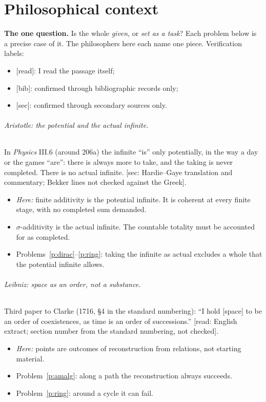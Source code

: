 \documentclass[11pt]{article}
\theoremstyle{definition}
\theoremstyle{remark}
\newcommand{\bp}[1]{\begin{mdframed}[backgroundcolor=black!4,linewidth=0.4pt]#1\end{mdframed}}
\begin{document}
\tableofcontents

\part*{Philosophical context}

\bp{\textbf{The one question.} Is the whole \emph{given}, or \emph{set as a task}?
Each problem below is a precise case of it. The philosophers here each name one
piece. Verification labels:
\begin{itemize}[nosep]
  \item \textsf{[read]}: I read the passage itself;
  \item \textsf{[bib]}: confirmed through bibliographic records only;
  \item \textsf{[sec]}: confirmed through secondary sources only.
\end{itemize}}

\paragraph{Aristotle: the potential and the actual infinite.}
In \emph{Physics} III.6 (around 206a) the infinite ``is'' only potentially, in the
way a day or the games ``are'': there is always more to take, and the taking is
never completed. There is no actual infinite. \textsf{[sec: Hardie--Gaye
translation and commentary; Bekker lines not checked against the Greek]}.
\begin{itemize}[nosep]
  \item \emph{Here:} finite additivity is the potential infinite. It is coherent
    at every finite stage, with no completed sum demanded.
  \item $\sigma$-additivity is the actual infinite. The countable totality must
    be accounted for as completed.
  \item Problems~\ref{p:dirac}--\ref{p:ring}: taking the infinite as actual
    excludes a whole that the potential infinite allows.
\end{itemize}

\paragraph{Leibniz: space as an order, not a substance.}
Third paper to Clarke (1716, \S4 in the standard numbering): ``I hold [space] to
be an order of coexistences, as time is an order of successions.''
\textsf{[read: English extract; section number from the standard numbering, not
checked]}.
\begin{itemize}[nosep]
  \item \emph{Here:} points are outcomes of reconstruction from relations, not
    starting material.
  \item Problem~\ref{p:amalg}: along a path the reconstruction always succeeds.
  \item Problem~\ref{p:ring}: around a cycle it can fail.
\end{itemize}
\end{document}
